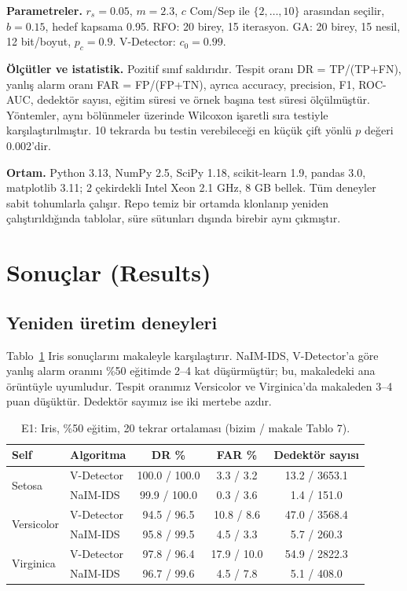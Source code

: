 \documentclass[11pt,a4paper]{article}
\begin{document}
\textbf{Parametreler.} $r_s=0.05$, $m=2.3$, $c$ Com/Sep ile $\{2,\dots,10\}$ arasından seçilir, $b=0.15$, hedef kapsama 0.95. RFO: 20 birey, 15 iterasyon. GA: 20 birey, 15 nesil, 12 bit/boyut, $p_c=0.9$. V-Detector: $c_0=0.99$.

\textbf{Ölçütler ve istatistik.} Pozitif sınıf saldırıdır. Tespit oranı DR = TP/(TP+FN), yanlış alarm oranı FAR = FP/(FP+TN), ayrıca accuracy, precision, F1, ROC-AUC, dedektör sayısı, eğitim süresi ve örnek başına test süresi ölçülmüştür. Yöntemler, aynı bölünmeler üzerinde Wilcoxon işaretli sıra testiyle karşılaştırılmıştır. 10 tekrarda bu testin verebileceği en küçük çift yönlü $p$ değeri 0.002'dir.

\textbf{Ortam.} Python 3.13, NumPy 2.5, SciPy 1.18, scikit-learn 1.9, pandas 3.0, matplotlib 3.11; 2 çekirdekli Intel Xeon 2.1 GHz, 8 GB bellek. Tüm deneyler sabit tohumlarla çalışır. Repo temiz bir ortamda klonlanıp yeniden çalıştırıldığında tablolar, süre sütunları dışında birebir aynı çıkmıştır.

\section{Sonuçlar (Results)}

\subsection{Yeniden üretim deneyleri}

Tablo~\ref{tab:e1} Iris sonuçlarını makaleyle karşılaştırır. NaIM-IDS, V-Detector'a göre yanlış alarm oranını \%50 eğitimde 2--4 kat düşürmüştür; bu, makaledeki ana örüntüyle uyumludur. Tespit oranımız Versicolor ve Virginica'da makaleden 3--4 puan düşüktür. Dedektör sayımız ise iki mertebe azdır.

\begin{table}[H]
\centering\small
\caption{E1: Iris, \%50 eğitim, 20 tekrar ortalaması (bizim / makale Tablo 7).}\label{tab:e1}
\begin{tabular}{@{}llccc@{}}
\toprule
Self & Algoritma & DR \% & FAR \% & Dedektör sayısı \\
\midrule
\multirow{2}{*}{Setosa} & V-Detector & 100.0 / 100.0 & 3.3 / 3.2 & 13.2 / 3653.1 \\
 & NaIM-IDS & 99.9 / 100.0 & 0.3 / 3.6 & 1.4 / 151.0 \\
\multirow{2}{*}{Versicolor} & V-Detector & 94.5 / 96.5 & 10.8 / 8.6 & 47.0 / 3568.4 \\
 & NaIM-IDS & 95.8 / 99.5 & 4.5 / 3.3 & 5.7 / 260.3 \\
\multirow{2}{*}{Virginica} & V-Detector & 97.8 / 96.4 & 17.9 / 10.0 & 54.9 / 2822.3 \\
 & NaIM-IDS & 96.7 / 99.6 & 4.5 / 7.8 & 5.1 / 408.0 \\
\bottomrule
\end{tabular}
\end{table}
\end{document}
